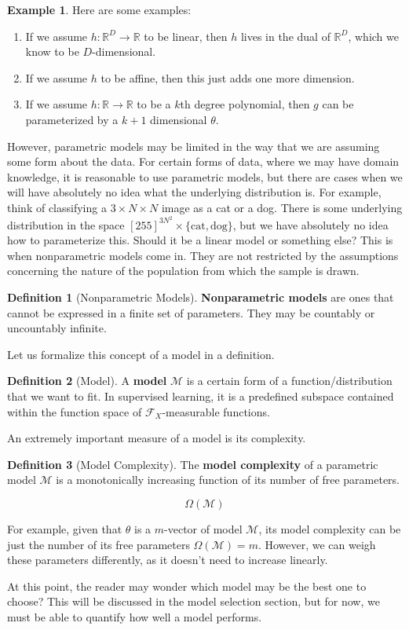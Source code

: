 \documentclass{article}
\theoremstyle{definition}
\newtheorem{example}{Example}[section]
\newtheorem{definition}{Definition}[section]
\begin{document}
    \begin{example}
      Here are some examples: 
      \begin{enumerate}
        \item If we assume $h: \mathbb{R}^D \rightarrow \mathbb{R}$ to be linear, then $h$ lives in the dual of $\mathbb{R}^D$, which we know to be $D$-dimensional. 
        \item If we assume $h$ to be affine, then this just adds one more dimension. 
        \item If we assume $h: \mathbb{R} \rightarrow \mathbb{R}$ to be a $k$th degree polynomial, then $g$ can be parameterized by a $k+1$ dimensional $\theta$. 
      \end{enumerate}
    \end{example}

    However, parametric models may be limited in the way that we are assuming some form about the data. For certain forms of data, where we may have domain knowledge, it is reasonable to use parametric models, but there are cases when we will have absolutely no idea what the underlying distribution is. For example, think of classifying a $3 \times N \times N$ image as a cat or a dog. There is some underlying distribution in the space $[255]^{3 N^2} \times \{\text{cat}, \text{dog}\}$, but we have absolutely no idea how to parameterize this. Should it be a linear model or something else? This is when nonparametric models come in. They are not restricted by the assumptions concerning the nature of the population from which the sample is drawn. 

    \begin{definition}[Nonparametric Models]
      \textbf{Nonparametric models} are ones that cannot be expressed in a finite set of parameters. They may be countably or uncountably infinite. 
    \end{definition}

    Let us formalize this concept of a model in a definition. 

    \begin{definition}[Model]
      A \textbf{model} $\mathcal{M}$ is a certain form of a function/distribution that we want to fit. In supervised learning, it is a predefined subspace contained within the function space of $\mathcal{F}_X$-measurable functions. 
    \end{definition}

    An extremely important measure of a model is its complexity. 

    \begin{definition}[Model Complexity]
      The \textbf{model complexity} of a parametric model $\mathcal{M}$ is a monotonically increasing function of its number of free parameters. 

        \[\Omega(\mathcal{M})\]

      For example, given that $\theta$ is a $m$-vector of model $\mathcal{M}$, its model complexity can be just the number of its free parameters $\Omega(\mathcal{M}) = m$. However, we can weigh these parameters differently, as it doesn't need to increase linearly. 
    \end{definition}

    At this point, the reader may wonder which model may be the best one to choose? This will be discussed in the model selection section, but for now, we must be able to quantify how well a model performs. 
\end{document}
